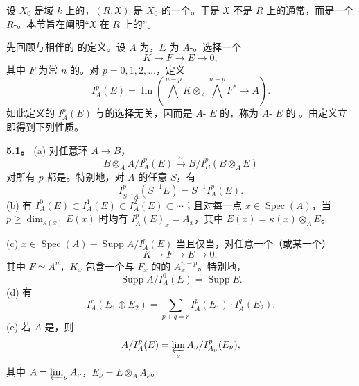 设 $X_0$ 是域 $k$ 上的，$(R,\mathfrak X)$ 是 $X_0$ 的一个。于是 $\mathfrak X$ 不是 $R$ 上的通常，而是一个 $R$-。本节旨在阐明“$\mathfrak X$ 在 $R$ 上的”。

先回顾与相伴的 的定义。设 $A$ 为，$E$ 为 $A$-。选择一个
\[
K\longrightarrow F\longrightarrow E\longrightarrow0,
\]
其中 $F$ 为常 $n$ 的。对 $p=0,1,2,\ldots$，定义
\[
I_A^p(E)=\operatorname{Im}\left(\bigwedge^{n-p}K\otimes_A\bigwedge^{n-p}F^*\longrightarrow A\right).
\]
如此定义的 $I_A^p(E)$ 与的选择无关，因而是 $A$- $E$ 的，称为 $A$- $E$ 的 。由定义立即得到下列性质。

\textbf{5.1。} (a) 对任意环 $A\to B$，
\[
B\otimes_A A/I_A^p(E)\xrightarrow\sim B/I_B^p(B\otimes_A E)
\]
对所有 $p$ 都是。特别地，对 $A$ 的任意 $S$，有
\[
I_{S^{-1}A}^p(S^{-1}E)=S^{-1}I_A^p(E).
\]
(b) 有 $I_A^0(E)\subset I_A^1(E)\subset I_A^2(E)\subset\cdots$；且对每一点 $x\in\operatorname{Spec}(A)$，当 $p\geq\dim_{\kappa(x)}E(x)$ 时均有 $I_A^p(E)_x=A_x$，其中 $E(x)=\kappa(x)\otimes_A E$。

(c) $x\in\operatorname{Spec}(A)-\operatorname{Supp}A/I_A^p(E)$ 当且仅当，对任意一个（或某一个）
\[
K\longrightarrow F\longrightarrow E\longrightarrow0,
\]
其中 $F\simeq A^n$，$K_x$ 包含一个与 $F_x$ 的的 $A_x^{n-p}$。特别地，
\[
\operatorname{Supp}A/I_A^0(E)=\operatorname{Supp}E.
\]
(d) 有
\[
I_A^r(E_1\oplus E_2)=\sum_{p+q=r}I_A^p(E_1)\cdot I_A^q(E_2).
\]
(e) 若 $A$ 是，则
\[
A/I_A^p(E)=\varprojlim_\nu A_\nu/I_{A_\nu}^p(E_\nu),
\]
其中 $A=\varprojlim_\nu A_\nu$，$E_\nu=E\otimes_A A_\nu$。

